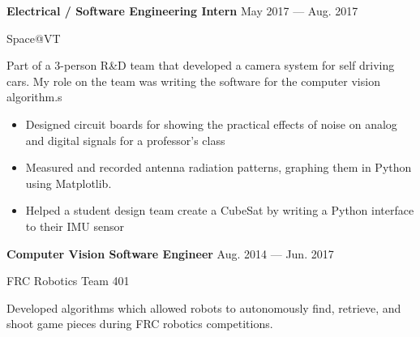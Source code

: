 \parbox[t][][t]{\linewidth}{
	\parbox{\linewidth}{\textbf{Electrical / Software Engineering Intern}
		\hfill {{May 2017 --- Aug. 2017}}}
	\smallbreak
	\parbox{\linewidth}{Space@VT}
	
	\bigskip
	
	Part of a 3-person R\&D team that developed a camera system for self driving cars. My role on the team was writing the software for the computer vision algorithm.s
	
	\bigskip
	\begin{itemize}
		\item{Designed circuit boards for showing the practical effects of noise on analog and digital signals for a professor's class}\\[-.6em]
		
		\item{Measured and recorded antenna radiation patterns, graphing them in Python using Matplotlib.}\\[-.6em]
		
		\item{Helped a student design team create a CubeSat by writing a Python interface to their IMU sensor}
		
	\end{itemize}
	\bigskip
	\bigskip
}

\parbox[t][][t]{\linewidth}{
	\parbox{\linewidth}{\textbf{Computer Vision Software Engineer}
		\hfill {{Aug. 2014 --- Jun. 2017}}}
	\smallbreak
	\parbox{\linewidth}{FRC Robotics Team 401}
	
	\bigskip
	
	Developed algorithms which allowed robots to autonomously find, retrieve, and shoot game pieces during FRC robotics competitions. 

}
